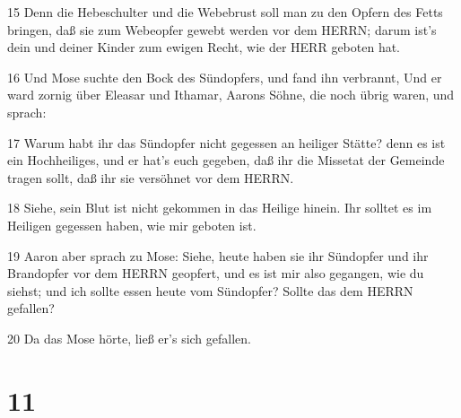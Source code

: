 \par 15 Denn die Hebeschulter und die Webebrust soll man zu den Opfern des Fetts bringen, daß sie zum Webeopfer gewebt werden vor dem HERRN; darum ist's dein und deiner Kinder zum ewigen Recht, wie der HERR geboten hat.
\par 16 Und Mose suchte den Bock des Sündopfers, und fand ihn verbrannt, Und er ward zornig über Eleasar und Ithamar, Aarons Söhne, die noch übrig waren, und sprach:
\par 17 Warum habt ihr das Sündopfer nicht gegessen an heiliger Stätte? denn es ist ein Hochheiliges, und er hat's euch gegeben, daß ihr die Missetat der Gemeinde tragen sollt, daß ihr sie versöhnet vor dem HERRN.
\par 18 Siehe, sein Blut ist nicht gekommen in das Heilige hinein. Ihr solltet es im Heiligen gegessen haben, wie mir geboten ist.
\par 19 Aaron aber sprach zu Mose: Siehe, heute haben sie ihr Sündopfer und ihr Brandopfer vor dem HERRN geopfert, und es ist mir also gegangen, wie du siehst; und ich sollte essen heute vom Sündopfer? Sollte das dem HERRN gefallen?
\par 20 Da das Mose hörte, ließ er's sich gefallen.

\chapter{11}

